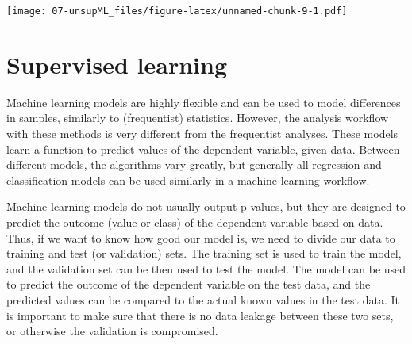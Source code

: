 \documentclass[
  oneside]{book}
\newenvironment{Shaded}{\begin{snugshade}}{\end{snugshade}}
\newcommand{\AttributeTok}[1]{\textcolor[rgb]{0.77,0.63,0.00}{#1}}
\newcommand{\CommentTok}[1]{\textcolor[rgb]{0.56,0.35,0.01}{\textit{#1}}}
\newcommand{\ConstantTok}[1]{\textcolor[rgb]{0.00,0.00,0.00}{#1}}
\newcommand{\DecValTok}[1]{\textcolor[rgb]{0.00,0.00,0.81}{#1}}
\newcommand{\FunctionTok}[1]{\textcolor[rgb]{0.00,0.00,0.00}{#1}}
\newcommand{\NormalTok}[1]{#1}
\newcommand{\SpecialCharTok}[1]{\textcolor[rgb]{0.00,0.00,0.00}{#1}}
\newcommand{\StringTok}[1]{\textcolor[rgb]{0.31,0.60,0.02}{#1}}
\begin{document}
\begin{Shaded}
\end{Shaded}

\texttt{[image: 07-unsupML\_files/figure-latex/unnamed-chunk-9-1.pdf]}

\hypertarget{supervised-learning}{%
\chapter{Supervised learning}\label{supervised-learning}}

Machine learning models are highly flexible and can be used to model differences in
samples, similarly to (frequentist) statistics. However, the analysis workflow with
these methods is very different from the frequentist analyses. These models learn
a function to predict values of the dependent variable, given data. Between different
models, the algorithms vary greatly, but generally all regression and classification
models can be used similarly in a machine learning workflow.

Machine learning models do not usually output p-values, but they are designed to
predict the outcome (value or class) of the dependent variable based on data.
Thus, if we want to know how good our model is, we need to divide our data to training
and test (or validation) sets. The training set is used to train the model, and the
validation set can be then used to test the model. The model can be used to predict
the outcome of the dependent variable on the test data, and the predicted values can
be compared to the actual known values in the test data. It is important to make sure
that there is no data leakage between these two sets, or otherwise the validation is
compromised.
\end{document}
